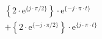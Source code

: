\correct
\[
\begin{split}
& \left \{ 2 \cdot \textrm{e}^{\{ j \cdot \pi/2 \}} \right \} \cdot \textrm{e}^{\{- j \cdot \pi \cdot t \}}\\
&+\left \{ 2 \cdot \textrm{e}^{\{-j \cdot \pi/2 \}} \right \} \cdot \textrm{e}^{\{  j \cdot \pi \cdot t \}}
\end{split}
\]
